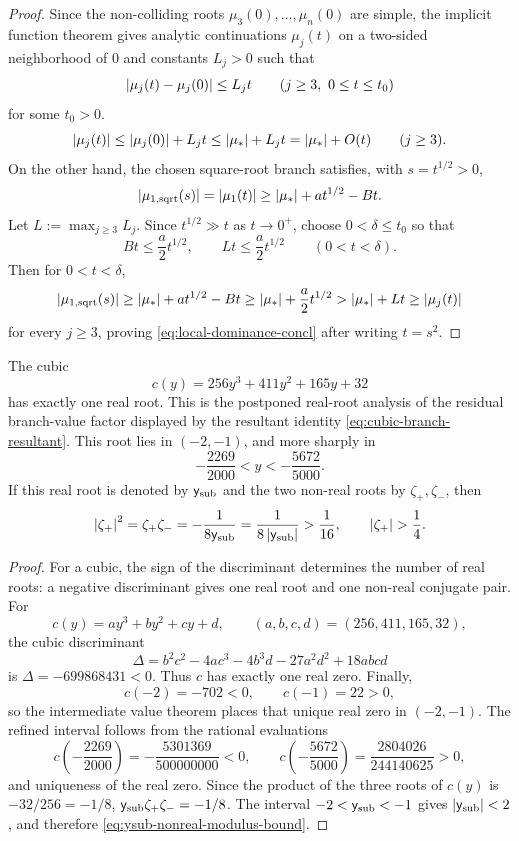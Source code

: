 \begin{proof}
Since the non-colliding roots \(\mu_3(0),\dots,\mu_n(0)\) are simple, the implicit function theorem gives analytic continuations \(\mu_j(t)\) on a two-sided neighborhood of \(0\) and constants \(L_j>0\) such that
\[
\left\lvert \mu_j(t)-\mu_j(0)\right\rvert\le L_j t
\qquad (j\ge 3,\ 0\le t\le t_0)
\]
for some \(t_0>0\).
\[
\left\lvert \mu_j(t)\right\rvert
\le
\left\lvert \mu_j(0)\right\rvert+L_j t
\le
\left\lvert \mu_*\right\rvert+L_j t
=
\left\lvert \mu_*\right\rvert+O(t)
\qquad (j\ge 3).
\]
On the other hand, the chosen square-root branch satisfies, with \(s=t^{1/2}>0\),
\[
\left\lvert \mu_{1,\mathrm{sqrt}}(s)\right\rvert=\left\lvert \mu_1(t)\right\rvert\ge \left\lvert \mu_*\right\rvert+a t^{1/2}-Bt.
\]
Let \(L:=\max_{j\ge 3}L_j\).
Since \(t^{1/2}\gg t\) as \(t\to0^+\), choose \(0<\delta\le t_0\) so that
\[
Bt\le \frac{a}{2}t^{1/2},
\qquad
Lt\le \frac{a}{2}t^{1/2}
\qquad (0<t<\delta).
\]
Then for \(0<t<\delta\),
\[
\left\lvert \mu_{1,\mathrm{sqrt}}(s)\right\rvert
\ge
\left\lvert \mu_*\right\rvert+a t^{1/2}-Bt
\ge
\left\lvert \mu_*\right\rvert+\frac{a}{2}t^{1/2}
>
\left\lvert \mu_*\right\rvert+Lt
\ge
\left\lvert \mu_j(t)\right\rvert
\]
for every \(j\ge 3\), proving \eqref{eq:local-dominance-concl} after writing \(t=s^2\).
\end{proof}

\begin{lemma}\label{lem:cubic-branch-real-root}
The cubic
\[
c(y)=256y^3+411y^2+165y+32
\]
has exactly one real root.
This is the postponed real-root analysis of the residual branch-value factor displayed by the resultant identity \eqref{eq:cubic-branch-resultant}.
This root lies in \((-2,-1)\), and more sharply in
\begin{equation}\label{eq:ysub-certified-interval}
-\frac{2269}{2000}<y<-\frac{5672}{5000}.
\end{equation}
If this real root is denoted by \(\mathsf{y}_{\mathrm{sub}}\) and the two non-real roots by
\(\zeta_{+},\zeta_{-}\), then
\begin{equation}\label{eq:ysub-nonreal-modulus-bound}
\left\lvert \zeta_{+}\right\rvert^2=
\zeta_{+}\zeta_{-}
=-
\frac{1}{8\mathsf{y}_{\mathrm{sub}}}
=\frac{1}{8\left\lvert \mathsf{y}_{\mathrm{sub}}\right\rvert}
>
\frac1{16},
\qquad
\left\lvert \zeta_{+}\right\rvert>\frac14 .
\end{equation}
\end{lemma}

\begin{proof}
For a cubic, the sign of the discriminant determines the number of real roots: a negative discriminant gives one real root and one non-real conjugate pair.
For
\[
c(y)=ay^3+by^2+cy+d,
\qquad
(a,b,c,d)=(256,411,165,32),
\]
the cubic discriminant
\[
\Delta=b^2c^2-4ac^3-4b^3d-27a^2d^2+18abcd
\]
is \(\Delta=-699868431<0\).
Thus \(c\) has exactly one real zero.
Finally,
\[
c(-2)=-702<0,
\qquad
c(-1)=22>0,
\]
so the intermediate value theorem places that unique real zero in \((-2,-1)\).
The refined interval follows from the rational evaluations
\[
c\!\left(-\frac{2269}{2000}\right)=-\frac{5301369}{500000000}<0,
\qquad
c\!\left(-\frac{5672}{5000}\right)=\frac{2804026}{244140625}>0,
\]
and uniqueness of the real zero.
Since the product of the three roots of \(c(y)\) is \(-32/256=-1/8\),
\(\mathsf{y}_{\mathrm{sub}}\zeta_{+}\zeta_{-}=-1/8\).  The interval \(-2<\mathsf{y}_{\mathrm{sub}}<-1\) gives
\(\left\lvert \mathsf{y}_{\mathrm{sub}}\right\rvert<2\), and therefore \eqref{eq:ysub-nonreal-modulus-bound}.
\end{proof}

